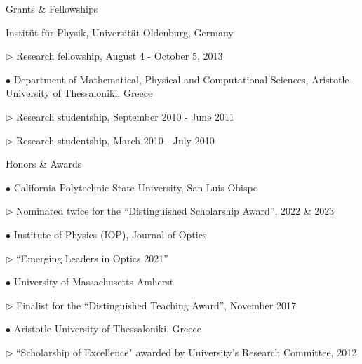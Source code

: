 \documentclass[10pt]{article} %
\newenvironment{outerlist}[1][\enskip\textbullet]%
        {\begin{itemize}[#1]}{\end{itemize}%
         \vspace{-.6\baselineskip}}
\newenvironment{innerlist}[1][\enskip\textbullet]%
        {\begin{compactitem}[#1]}{\end{compactitem}}
\begin{document}
\begin{section}{Grants \& Fellowships}
\begin{outerlist}
Instit\"ut f\"ur Physik, Universit\"at Oldenburg, Germany
\begin{innerlist}
\item[$\triangleright$] Research fellowship, August 4 - October 5, 2013
\end{innerlist}
\item[$\bullet$] Department of Mathematical, Physical and Computational 
Sciences, Aristotle University of Thessaloniki, Greece
\begin{innerlist}
\item [$\triangleright$] Research studentship, September 2010 - June 2011
\item [$\triangleright$] Research studentship, March 2010 - July 2010
\end{innerlist}

\end{outerlist}

\end{section}

\begin{section}{Honors \& Awards}
\begin{outerlist}

\item[$\bullet$] \vskip -7mm
California Polytechnic State University, San Luis Obispo
\begin{innerlist}
\item[$\triangleright$] Nominated twice for the ``Distinguished Scholarship Award'', 2022 \& 2023
\end{innerlist}
\item[$\bullet$]
Institute of Physics (IOP), Journal of Optics
\begin{innerlist}
\item[$\triangleright$] ``Emerging Leaders in Optics 2021''
\end{innerlist}
\item[$\bullet$] 
University of Massachusetts Amherst
\begin{innerlist}
\item[$\triangleright$] Finalist for the ``Distinguished Teaching Award'', November 2017
\end{innerlist}
\item[$\bullet$] Aristotle University of Thessaloniki, Greece
\begin{innerlist}
\item[$\triangleright$] ``Scholarship of Excellence" awarded by University's Research Committee, 2012
\end{innerlist}

\end{outerlist}

\end{section}
\end{document}
